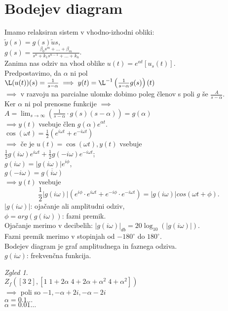 \documentclass[a4paper, 12pt]{book}
\theoremstyle{definition}
\theoremstyle{remark}
\newtheorem*{exmp}{Zgled}
\begin{document}
\section{Bodejev diagram}

Imamo relaksiran sistem v vhodno-izhodni obliki: \\
$\tilde{y}(s) = g(s) \tilde{u}{s}$, \\
$g(s) = \frac{\beta_0 s^m + \dots + \beta_m}{s^n + k_1 s^{n-1} + \dots + k_n}$. \\
Zanima nas odziv na vhod oblike $u(t) = e^{\alpha t} [u_s(t)]$. \\
Predpostavimo, da $\alpha$ ni pol \\
$\L(u(t))(s) = \frac{1}{s-\alpha} \implies y(t) =
\L^{-1}\left(\frac{1}{s-\alpha} g(s)\right)(t)$ \\
$\implies$ v razvoju na parcialne ulomke dobimo poleg členov s poli $g$ še $\frac{A}{s-\alpha}$. \\
Ker $\alpha$ ni pol prenosne funkcije $\implies$ \\
$A = \lim_{s \to \infty} \left(\frac{1}{s-\alpha} \cdot g(s) (s-\alpha)\right) = g(\alpha)$ \\
$\implies y(t)$ vsebuje člen $g(\alpha) e^{\alpha t}$. \\
$\cos(\omega t) = \frac{1}{2} \left(e^{i \omega t} + e^{-i \omega t}\right)$ \\
$\implies$ če je $u(t) = \cos(\omega t), y(t)$ vsebuje \\
$\frac{1}{2} g(i \omega) e^{i \omega t} + \frac{1}{2} g(-i \omega) e^{-i \omega t}$; \\
$g(i \omega) = |g(i \omega)| e^{i \phi}$, \\
$g(-i \omega) = \overline{g(i \omega)}$ \\
$\implies y(t)$ vsebuje
\begin{equation*}
  \frac{1}{2} |g(i \omega)| \left(e^{i \phi} \cdot e^{i \omega t} +
  e^{-i \phi} \cdot e^{-i \omega t}\right) = |g(i \omega)| cos(\omega t + \phi).
\end{equation*}
$|g(i \omega)|$: ojačanje ali amplitudni odziv, \\
$\phi = arg(g(i \omega))$: fazni premik. \\
Ojačanje merimo v decibelih: $|g(i \omega)|_{db} = 20 \log_{10} (|g(i \omega)|)$. \\
Fazni premik merimo v stopinjah od $-180^{\circ}$ do $180^{\circ}$. \\
Bodejev diagram je graf amplitudnega in faznega odziva. \\
$g(i \omega)$: frekvenčna funkcija.
\begin{exmp} \text{} \\
  $Z_f \left([3 \; 2], [1 \; 1+2\alpha \; 4+2\alpha+\alpha^2 \; 4+\alpha^2]\right)$ \\
  $\implies$ poli so $-1, -\alpha+2i, -\alpha-2i$ \\
  $\alpha = 0.1 \dots$ \\
  $\alpha = 0.01 \dots$
\end{exmp}
\end{document}
